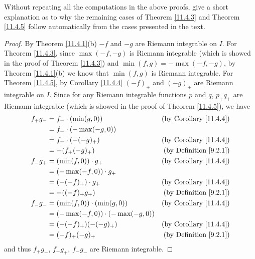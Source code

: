 \begin{exercise}\label{ex 11.4.4}
    Without repeating all the computations in the above proofs, give a short explanation as to why the remaining cases of Theorem \ref{11.4.3} and Theorem \ref{11.4.5} follow automatically from the cases presented in the text.
\end{exercise}

\begin{proof}
    By Theorem \ref{11.4.1}(b) \(-f\) and \(-g\) are Riemann integrable on \(I\).
    For Theorem \ref{11.4.3}, since \(\max(-f, -g)\) is Riemann integrable (which is showed in the proof of Theorem \ref{11.4.3}) and \(\min(f, g) = -\max(-f, -g)\), by Theorem \ref{11.4.1}(b) we know that \(\min(f, g)\) is Riemann integrable.
    For Theorem \ref{11.4.5}, by Corollary \ref{11.4.4} \((-f)_+\) and \((-g)_+\) are Riemann integrable on \(I\).
    Since for any Riemann integrable functions \(p\) and \(q\), \(p_+ q_+\) are Riemann integrable (which is showed in the proof of Theorem \ref{11.4.5}), we have
    \begin{align*}
        f_+ g_- & = f_+ \cdot (\min(g, 0))              & \text{(by Corollary \ref{11.4.4})} \\
                & = f_+ \cdot (-\max(-g, 0))                                                 \\
                & = f_+ \cdot (-(-g)_+)                 & \text{(by Corollary \ref{11.4.4})} \\
                & = -(f_+ (-g)_+)                       & \text{(by Definition \ref{9.2.1})} \\
        f_- g_+ & = (\min(f, 0)) \cdot g_+              & \text{(by Corollary \ref{11.4.4})} \\
                & = (-\max(-f, 0)) \cdot g_+                                                 \\
                & = (-(-f)_+) \cdot g_+                 & \text{(by Corollary \ref{11.4.4})} \\
                & = -((-f)_+ g_+)                       & \text{(by Definition \ref{9.2.1})} \\
        f_- g_- & = (\min(f, 0)) \cdot (\min(g, 0))     & \text{(by Corollary \ref{11.4.4})} \\
                & = (-\max(-f, 0)) \cdot (-\max(-g, 0))                                      \\
                & = (-(-f)_+) (-(-g)_+)                 & \text{(by Corollary \ref{11.4.4})} \\
                & = (-f)_+ (-g)_+                       & \text{(by Definition \ref{9.2.1})}
    \end{align*}
    and thus \(f_+ g_-\), \(f_- g_+\), \(f_- g_-\) are Riemann integrable.
\end{proof}